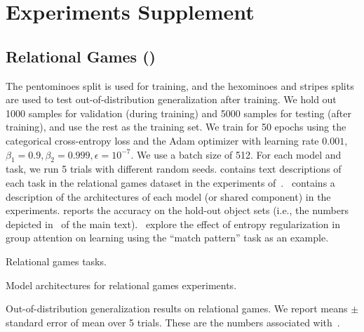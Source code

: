 \section{Experiments Supplement}\label{sec:experiments_supplement}

\subsection{Relational Games ()}

The pentominoes split is used for training, and the hexominoes and stripes splits are used to test out-of-distribution generalization after training. We hold out 1000 samples for validation (during training) and 5000 samples for testing (after training), and use the rest as the training set. We train for 50 epochs using the categorical cross-entropy loss and the Adam optimizer with learning rate $0.001$, $\beta_1 = 0.9, \beta_2 = 0.999, \epsilon = 10^{-7}$. We use a batch size of 512. For each model and task, we run 5 trials with different random seeds. contains text descriptions of each task in the relational games dataset in the experiments of~.~ contains a description of the architectures of each model (or shared component) in the experiments.
 reports the accuracy on the hold-out object sets (i.e., the numbers depicted in~ of the main text).~ explore the effect of entropy regularization in group attention on learning using the ``match pattern'' task as an example.

\begin{table}[H]
    \centering
    
    \caption{Relational games tasks.}\label{tab:relational_games_tasks}
\end{table}

\begin{table}[H]
    \centering
    
    \caption{Model architectures for relational games experiments.}\label{tab:relgames_architectures}
\end{table}

\begin{table}[H]
    \centering
    
    \caption{Out-of-distribution generalization results on relational games. We report means $\pm$ standard error of mean over 5 trials. These are the numbers associated with~.}\label{tab:ood_generalization}
\end{table}


